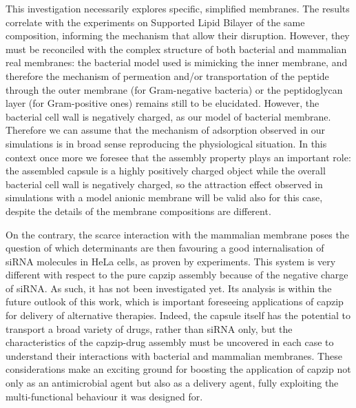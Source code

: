 This investigation necessarily explores specific, simplified membranes. The results correlate with the experiments on Supported Lipid Bilayer of the same composition, informing the mechanism that allow their disruption. However, they must be reconciled with the complex structure of both bacterial and mammalian real membranes: the bacterial model used is mimicking the inner membrane, and therefore the mechanism of permeation and/or transportation of the peptide through the outer membrane (for Gram-negative bacteria) or the peptidoglycan layer (for Gram-positive ones) remains still to be elucidated.
%
However, the bacterial cell wall is negatively charged, as our model of bacterial membrane. Therefore we can assume that the mechanism of adsorption observed in our simulations is in broad sense reproducing the physiological situation.
%
In this context once more we foresee that the assembly property plays an important role: the assembled capsule is a highly positively charged object while the overall bacterial cell wall is negatively charged, so the attraction effect observed in simulations with a model anionic membrane will be valid also for this case, despite the details of the membrane compositions are different. 

On the contrary, the scarce interaction with the mammalian membrane poses the question of which determinants are then favouring a good internalisation of siRNA molecules in HeLa cells, as proven by experiments. This system is very different with respect to the pure capzip assembly because of the negative charge of siRNA. As such, it has not been investigated yet. Its analysis is within the future outlook of this work, which is important foreseeing applications of capzip for delivery of alternative therapies.
%
Indeed, the capsule itself has the potential to transport a broad variety of drugs, rather than siRNA only, but the characteristics of the capzip-drug assembly must be uncovered in each case to understand their interactions with bacterial and mammalian membranes.
%
These considerations make an exciting ground for boosting the application of capzip not only as an antimicrobial agent but also as a delivery agent, fully exploiting the multi-functional behaviour it was designed for.

